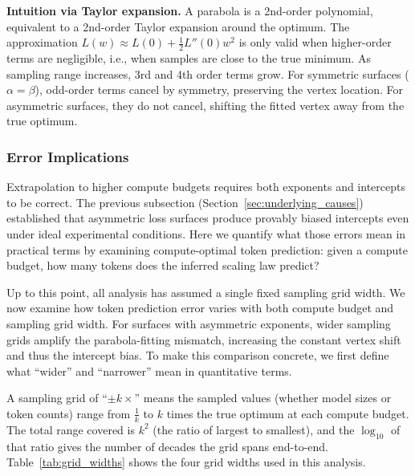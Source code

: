 \documentclass[11pt]{article}
\begin{document}
\textbf{Intuition via Taylor expansion.}
A parabola is a 2nd-order polynomial, equivalent to a 2nd-order Taylor
expansion around the optimum. The approximation
$L(w) \approx L(0) + \frac{1}{2}L''(0)w^2$ is only valid when higher-order
terms are negligible, i.e., when samples are close to the true minimum. As
sampling range increases, 3rd and 4th order terms grow. For symmetric surfaces
($\alpha = \beta$), odd-order terms cancel by symmetry, preserving the vertex
location. For asymmetric surfaces, they do not cancel, shifting the fitted
vertex away from the true optimum.

\subsubsection{Error Implications}
\label{sec:error_implications}

Extrapolation to higher compute budgets requires both exponents and intercepts
to be correct. The previous subsection (Section~\ref{sec:underlying_causes})
established that asymmetric loss surfaces produce provably biased intercepts
even under ideal experimental
conditions. Here we quantify what those errors mean in practical terms by
examining compute-optimal token prediction: given a compute budget, how many
tokens does the inferred scaling law predict?

Up to this point, all analysis has assumed a single fixed sampling grid width.
We now examine how token prediction error varies with both compute budget and
sampling grid width. For surfaces with asymmetric exponents, wider sampling
grids amplify the parabola-fitting mismatch, increasing the constant vertex
shift and thus the intercept bias. To make this comparison concrete, we first
define what ``wider'' and ``narrower'' mean in quantitative terms.

A sampling grid of ``$\pm k\times$'' means the sampled values (whether model
sizes or token counts) range from $\frac{1}{k}$ to $k$ times the true optimum
at each compute budget. The total range covered is $k^2$ (the ratio of largest
to smallest), and the $\log_{10}$ of that ratio gives the number of decades the
grid spans end-to-end. Table~\ref{tab:grid_widths} shows the four grid widths
used in this analysis.
\end{document}
